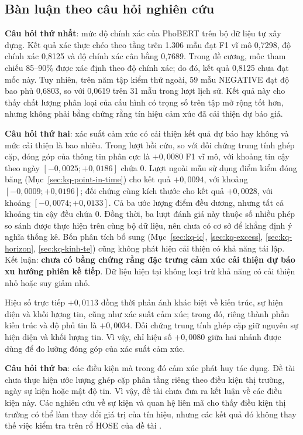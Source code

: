 \documentclass[12pt, a4paper, oneside]{report}
\begin{document}
\subsection{Bàn luận theo câu hỏi nghiên cứu}

\textbf{Câu hỏi thứ nhất}: mức độ chính xác của PhoBERT trên bộ dữ liệu tự xây dựng.
Kết quả xác thực chéo theo tầng trên 1.306 mẫu đạt F1 vĩ mô 0,7298, độ chính xác 0,8125 và độ
chính xác cân bằng 0,7689. Trong đề cương, mốc tham chiếu 85--90\% được xác định theo
độ chính xác; do đó, kết quả 0,8125 chưa đạt mốc này. Tuy nhiên, trên năm tập kiểm
thử ngoài, 59 mẫu NEGATIVE đạt độ bao phủ 0,6803, so với 0,0619 trên 31 mẫu trong lượt
lịch sử. Kết quả này cho thấy chất lượng phân loại của cấu hình có trọng số trên tập mở rộng
tốt hơn, nhưng không phải bằng chứng rằng tín hiệu cảm xúc đã cải thiện dự báo giá.

\textbf{Câu hỏi thứ hai}: xác suất cảm xúc có cải thiện kết quả dự báo hay không và mức cải
thiện là bao nhiêu. Trong lượt hồi cứu, so với đối chứng trung tính ghép cặp, đóng góp của
thông tin phân cực là $+0{,}0080$ F1 vĩ mô, với khoảng tin cậy theo ngày
$[-0{,}0025; +0{,}0186]$ chứa 0. Lượt ngoài mẫu sử dụng điểm kiểm đóng băng
(Mục~\ref{sec:kq-point-in-time}) cho kết quả $+0{,}0094$, với khoảng
$[-0{,}0009; +0{,}0196]$; đối chứng cùng kích thước cho kết quả $+0{,}0028$, với khoảng
$[-0{,}0074; +0{,}0133]$. Cả ba ước lượng điểm đều dương, nhưng tất cả khoảng tin cậy đều
chứa 0. Đồng thời, ba lượt đánh giá này thuộc số nhiều phép so sánh được thực hiện trên cùng
bộ dữ liệu, nên chưa có cơ sở để khẳng định ý nghĩa thống kê. Bốn phân tích bổ sung
(Mục~\ref{sec:kq-ic}, \ref{sec:kq-excess}, \ref{sec:kq-horizon}, \ref{sec:kq-kinh-te})
cũng không phát hiện cải thiện có khả năng tái lập. Kết luận:
\textbf{chưa có bằng chứng rằng đặc trưng cảm xúc cải thiện dự báo xu hướng phiên kế
tiếp}. Dữ liệu hiện tại không loại trừ khả năng có cải thiện nhỏ hoặc suy giảm nhỏ.

Hiệu số trực tiếp $+0{,}0113$ đồng thời phản ánh khác biệt về kiến trúc, sự hiện diện và
khối lượng tin, cũng như xác suất cảm xúc; trong đó, riêng thành phần kiến trúc và độ phủ
tin là $+0{,}0034$. Đối chứng trung tính ghép cặp giữ nguyên sự hiện diện và khối lượng
tin. Vì vậy, chỉ hiệu số $+0{,}0080$ giữa hai nhánh được dùng để đo lường đóng góp của xác
suất cảm xúc.

\textbf{Câu hỏi thứ ba}: các điều kiện mà trong đó cảm xúc phát huy tác dụng. Đề tài chưa
thực hiện ước lượng ghép cặp phân tầng riêng theo điều kiện thị trường, ngày sự kiện hoặc
mật độ tin. Vì vậy, đề tài chưa đưa ra kết luận về các điều kiện này. Các nghiên cứu về sự
kiện và quan hệ liên mã cho thấy điều kiện thị trường có thể làm thay đổi giá trị của tín
hiệu, nhưng các kết quả đó không thay thế việc kiểm tra trên rổ HOSE của đề tài
\cite{Chen2019_191005078v1,Xu2021_210207372v2,Siala2026_260200086v3}.
\end{document}

